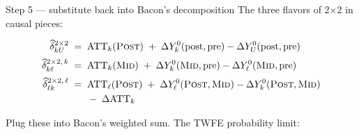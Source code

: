 \documentclass[aspectratio=169,11pt]{beamer}
\begin{document}
\begin{frame}{Step 5 --- substitute back into Bacon's decomposition}
\vspace{0.4em}
The three flavors of 2$\times$2 in causal pieces:

\vspace{0.3em}
\begin{align*}
\widehat{\delta}^{2\times 2}_{kU} \;&=\; \text{ATT}_k(\textsc{Post}) \;+\; \Delta Y^0_k(\text{post},\text{pre}) - \Delta Y^0_U(\text{post},\text{pre}) \\[0.2em]
\widehat{\delta}^{2\times 2,\,k}_{k\ell} \;&=\; \text{ATT}_k(\textsc{Mid}) \;+\; \Delta Y^0_k(\textsc{Mid},\text{pre}) - \Delta Y^0_\ell(\textsc{Mid},\text{pre}) \\[0.2em]
\widehat{\delta}^{2\times 2,\,\ell}_{\ell k} \;&=\; \text{ATT}_\ell(\textsc{Post}) \;+\; \Delta Y^0_\ell(\textsc{Post},\textsc{Mid}) - \Delta Y^0_k(\textsc{Post},\textsc{Mid}) \\
                                          &\phantom{\;=\;}\; -\; \Delta\text{ATT}_k
\end{align*}

Plug these into Bacon's weighted sum. \;The TWFE probability limit:
\begin{center}
\end{center}
\end{frame}
\end{document}
